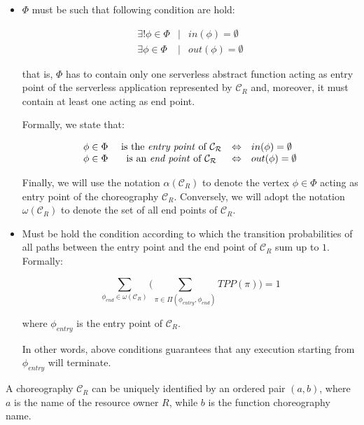 \documentclass[12pt,a4paper]{report}
\begin{document}
\begin{itemize}
	\item $\Phi$ must be such that following condition are hold:
	
	\begin{eqnarray}
		\exists !  \phi \in \Phi &\mid & in(\phi) = \emptyset \label{cond1} \\
		\exists   \phi \in \Phi & \mid & out(\phi) = \emptyset \label{cond2}
	\end{eqnarray}
	
	that is, $\Phi$ has to contain only one serverless abstract function acting as entry point of the serverless application represented by $\mathcal{C}_R$ and, moreover, it must contain at least one acting as end point. 
	
	Formally, we state that:
	
	\begin{equation}
		\begin{array}{lcll}
			\phi \in \Phi & \text{ is the \textit{entry point} of } \mathcal{C_R} & \Leftrightarrow & in(\phi) = \emptyset \\
			\phi \in \Phi & \text{ is an \textit{end point} of } \mathcal{C_R} & \Leftrightarrow & out(\phi) = \emptyset
		\end{array}
	\end{equation}
	
	Finally, we will use the notation $\alpha(\mathcal{C}_R)$ to denote the vertex $\phi \in \Phi$ acting as entry point of the choreography $\mathcal{C}_R$. Conversely, we will adopt the notation $\omega(\mathcal{C}_R)$ to denote the set of all end points of $\mathcal{C}_R$.
	
	
	\item Must be hold the condition according to which the transition probabilities of all paths between the entry point and	the end point of $\mathcal{C}_R$ sum up to $1$. Formally:
	
	\begin{equation}\label{cond3}
		\sum_{\phi_{end} \in \omega(\mathcal{C}_R)} \Big( \sum_{\pi \in \Pi(\phi_{entry}, \phi_{end})} TPP(\pi) \Big) = 1
	\end{equation}
	
	where $\phi_{entry}$ is the entry point of $\mathcal{C}_R$.
	
	In other words, above conditions guarantees that any execution starting from $\phi_{entry}$ will terminate.
	
\end{itemize} 

A choreography $\mathcal{C}_R$ can be uniquely identified by an ordered pair $(a, b)$, where $a$ is the name of the resource owner $R$, while $b$ is the function choreography name.
\end{document}
